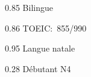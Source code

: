 
        {0.85}
        {Bilingue}
        {}{}{}

        {0.86}
        {TOEIC:~855/990}
        {}{}{}

        {0.95}
        {Langue natale}
        {}{}{}

        {0.28}
        {Débutant N4}
        {}{}{}


